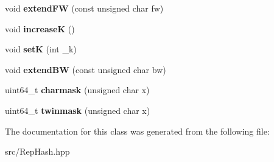 \begin{DoxyCompactItemize}
void {\bfseries extend\+FW} (const unsigned char fw)
\item 
\mbox{\label{classRepHash_a46b1630a9228c0fef3a69e7a3e626f4a}} 
void {\bfseries increaseK} ()
\item 
\mbox{\label{classRepHash_a0ad9fbf784ba32996990f484eab1bfcb}} 
void {\bfseries setK} (int \+\_\+k)
\item 
\mbox{\label{classRepHash_ab05770c1bc560cae7a95c2563f4a5c10}} 
void {\bfseries extend\+BW} (const unsigned char bw)
\item 
\mbox{\label{classRepHash_adb346b8498440469cd2846424d40862a}} 
uint64\+\_\+t {\bfseries charmask} (unsigned char x)
\item 
\mbox{\label{classRepHash_ab0cb71a47ff3920daf78833f45065ffa}} 
uint64\+\_\+t {\bfseries twinmask} (unsigned char x)
\end{DoxyCompactItemize}


The documentation for this class was generated from the following file\+:\begin{DoxyCompactItemize}
\item 
src/Rep\+Hash.\+hpp\end{DoxyCompactItemize}
